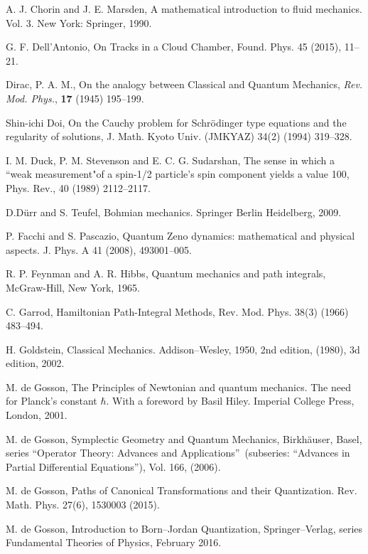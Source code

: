 \documentclass[12pt]{article}%
\begin{document}
\begin{thebibliography}{99}
A. J. Chorin and J. E. Marsden, A mathematical introduction to
fluid mechanics. Vol. 3. New York: Springer, 1990.

G. F. Dell'Antonio, On Tracks in a Cloud Chamber, Found. Phys.
45 (2015), 11--21.

Dirac, P. A. M., On the analogy between Classical and Quantum
Mechanics, \emph{Rev. Mod. Phys.}, \textbf{17} (1945) 195--199.

Shin-ichi Doi, On the Cauchy problem for Schr\"{o}dinger type
equations and the regularity of solutions, J. Math. Kyoto Univ. (JMKYAZ) 34(2)
(1994) 319--328.

I. M. Duck, P. M. Stevenson and E. C. G. Sudarshan, The
sense in which a \textquotedblleft weak measurement"of a spin-1/2 particle's
spin component yields a value 100, Phys. Rev., 40 (1989) 2112--2117.

D.D\"{u}rr and S. Teufel, Bohmian mechanics. Springer Berlin
Heidelberg, 2009.

P. Facchi and S. Pascazio, Quantum Zeno dynamics:
mathematical and physical aspects. J. Phys. A 41 (2008), 493001--005.

R. P. Feynman and A. R. Hibbs, Quantum mechanics and path
integrals, McGraw-Hill, New York, 1965.

C. Garrod, Hamiltonian Path-Integral Methods, Rev. Mod. Phys.
38(3) (1966) 483--494.

H. Goldstein, Classical Mechanics. Addison--Wesley, 1950,
2nd edition, (1980), 3d edition, 2002.

M. de Gosson, The Principles of Newtonian and quantum mechanics.
The need for Planck's constant $\hbar$. With a foreword by Basil Hiley.
Imperial College Press, London, 2001.

M. de Gosson, Symplectic Geometry and Quantum Mechanics,
Birkh\"{a}user, Basel, series \textquotedblleft Operator Theory: Advances and
Applications\textquotedblright\ (subseries: \textquotedblleft Advances in
Partial Differential Equations\textquotedblright), Vol. 166, (2006).

M. de Gosson, Paths of Canonical Transformations and their
Quantization. Rev. Math. Phys. 27(6), 1530003 (2015).

M. de Gosson, Introduction to Born--Jordan Quantization,
Springer--Verlag, series Fundamental Theories of Physics, February 2016.


\end{thebibliography}
\end{document}
